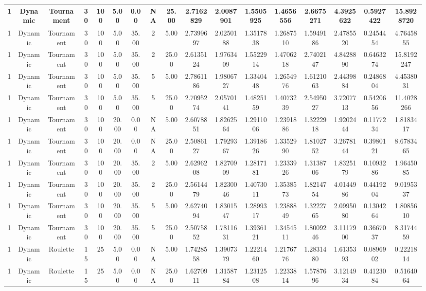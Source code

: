 \documentclass[a4paper]{article}
\begin{document}
\begin{center}
\begin{tabular}{ | c | c | c | c | c | c | c | c | c | c | c | c | c | c | c | c | c | }
		\hline
		1	&	Dynamic	&	Tournament	&	30	&	100	&	5.00	&	0.00	&	NA	&	25.00	&	2.7162829	&	2.0087901	&	1.5505925	&	1.4656556	&	2.6675271	&	4.3925622	&	0.5927422	&	15.8928720 \\
		\hline
		1	&	Dynamic	&	Tournament	&	30	&	100	&	5.00	&	35.00	&	2	&	5.00	&	2.7399697	&	2.0250188	&	1.3517838	&	1.2687510	&	1.5949186	&	2.4785520	&	0.2454454	&	4.7645855 \\
		\hline
		1	&	Dynamic	&	Tournament	&	30	&	100	&	5.00	&	35.00	&	2	&	25.00	&	2.6135124	&	1.9763409	&	1.5522914	&	1.4706218	&	2.7402147	&	4.8428890	&	0.6463274	&	15.8192247 \\
		\hline
		1	&	Dynamic	&	Tournament	&	30	&	100	&	5.00	&	35.00	&	5	&	5.00	&	2.7861186	&	1.9806727	&	1.3340448	&	1.2654976	&	1.6121063	&	2.4439884	&	0.2486804	&	4.4538031 \\
		\hline
		1	&	Dynamic	&	Tournament	&	30	&	100	&	5.00	&	35.00	&	5	&	25.00	&	2.7095274	&	2.0570141	&	1.4825159	&	1.4073239	&	2.5495027	&	3.7207713	&	0.5420656	&	11.4028266 \\
		\hline
		1	&	Dynamic	&	Tournament	&	30	&	100	&	20.00	&	0.00	&	NA	&	5.00	&	2.6078851	&	1.8262564	&	1.2911006	&	1.2391886	&	1.3222918	&	1.9202444	&	0.1177234	&	1.8183417 \\
		\hline
		1	&	Dynamic	&	Tournament	&	30	&	100	&	20.00	&	0.00	&	NA	&	25.00	&	2.5086127	&	1.7929367	&	1.3918626	&	1.3352990	&	1.8102752	&	3.2678144	&	0.3980121	&	8.6783465 \\
		\hline
		1	&	Dynamic	&	Tournament	&	30	&	100	&	20.00	&	35.00	&	2	&	5.00	&	2.6296208	&	1.8270909	&	1.2817181	&	1.2333926	&	1.3138706	&	1.8325179	&	0.1093286	&	1.9645085 \\
		\hline
		1	&	Dynamic	&	Tournament	&	30	&	100	&	20.00	&	35.00	&	2	&	25.00	&	2.5614479	&	1.8230046	&	1.4073011	&	1.3538573	&	1.8214754	&	4.0144986	&	0.4419204	&	9.0195337 \\
		\hline
		1	&	Dynamic	&	Tournament	&	30	&	100	&	20.00	&	35.00	&	5	&	5.00	&	2.6274094	&	1.8301547	&	1.2899317	&	1.2388849	&	1.3222765	&	2.0995080	&	0.1304264	&	1.8085610 \\
		\hline
		1	&	Dynamic	&	Tournament	&	30	&	100	&	20.00	&	35.00	&	5	&	25.00	&	2.5075852	&	1.7811631	&	1.3936121	&	1.3454511	&	1.8009246	&	3.1117900	&	0.3667037	&	8.3174459 \\
		\hline
		1	&	Dynamic	&	Roulette	&	15	&	25	&	5.00	&	0.00	&	NA	&	5.00	&	1.7428558	&	1.3907379	&	1.2221460	&	1.2176776	&	1.2831480	&	1.6135393	&	0.0896902	&	0.2221814 \\
		\hline
		1	&	Dynamic	&	Roulette	&	15	&	25	&	5.00	&	0.00	&	NA	&	25.00	&	1.6270911	&	1.3158784	&	1.2312508	&	1.2233814	&	1.5787696	&	3.1214934	&	0.4123084	&	0.5164064 \\

\end{tabular}
\end{center}
\end{document}
